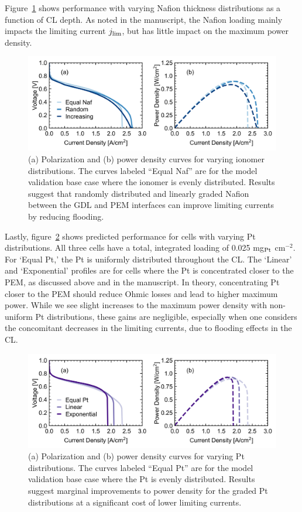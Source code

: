\documentclass[final,3p,times,onecolumn]{elsarticle}    %
\begin{document}
\newpage
Figure~\ref{fig:naf-distribution-study} shows performance with varying Nafion thickness distributions as a function of CL depth. As noted in the manuscript, the Nafion loading mainly impacts the limiting current $j_{\rm lim}$, but has little impact on the maximum power density.
\begin{figure}[H]
    \centering
    \includegraphics[width=5.718in]{figures/naf-distribution-5_718in.png}
    \caption{(a) Polarization and (b) power density curves for varying ionomer distributions. The curves labeled ``Equal Naf'' are for the model validation base case where the ionomer is evenly distributed. Results suggest that randomly distributed and linearly graded Nafion between the GDL and PEM interfaces can improve limiting currents by reducing flooding.}
    \label{fig:naf-distribution-study}
\end{figure}
Lastly, figure~\ref{fig:Pt-distribution-study} shows predicted performance for cells with varying Pt distributions.  All three cells have a total, integrated loading of 0.025 mg$_{\rm Pt}$ cm$^{-2}$.  For `Equal Pt,' the Pt is uniformly distributed throughout the CL.  The `Linear' and `Exponential' profiles are for cells where the Pt is concentrated closer to the PEM, as discussed above and in the manuscript.  In theory, concentrating Pt closer to the PEM should reduce Ohmic losses and lead to higher maximum power.  While we see slight increases to the maximum power density with non-uniform Pt distributions, these gains are negligible, especially when one considers the concomitant decreases in the limiting currents, due to flooding effects in the CL.
\begin{figure}[H]
    \centering
    \includegraphics[width=5.718in]{figures/pt-distribution-5_718in.png}
    \caption{(a) Polarization and (b) power density curves for varying Pt distributions. The curves labeled ``Equal Pt'' are for the model validation base case where the Pt is evenly distributed. Results suggest marginal improvements to power density for the graded Pt distributions at a significant cost of lower limiting currents.}
    \label{fig:Pt-distribution-study}
\end{figure}
\end{document}
